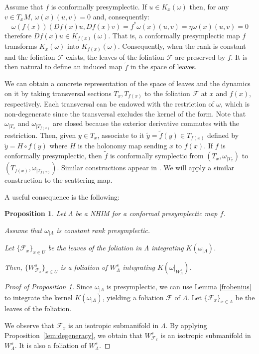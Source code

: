 \documentclass[11pt]{amsart}
\newtheorem{prop}[thm]{Proposition}
\theoremstyle{definition}
\theoremstyle{remark}
\numberwithin{equation}{section}
\newcommand{\F}{\mathcal{F}}
\begin{document}
Assume that $f$ is conformally presymplectic.
If $u \in K_x(\omega)$ then, for any $v\in T_{x}M$,  $\omega(x)(u,v)=0$ and, consequently:
\[
\omega(f(x)) (Df(x)u, Df(x)v)=f^*\omega(x)(u,v) =\eta \omega(x)(u,v)=0
\]
therefore $Df(x)u \in K_{f(x)}(\omega)$.
That is, a conformally presymplectic map $f$ transforms
$K_x(\omega)$ into $K_{f(x)}(\omega)$.
Consequently, when  the rank is constant and the foliation
$\F$ exists,  the leaves of the foliation $\F$ are
preserved by $f$. It is then natural
to define an induced map $\tilde{f}$ in the space of leaves.


We can obtain a concrete representation  of the space of leaves and the dynamics on it by taking transversal sections
$T_x, T_{f(x)} $
to the foliation $\F$ at $x$ and $f(x)$, respectively.
Each transversal  can be endowed with the restriction of
$\omega$, which is non-degenerate since the transversal
excludes the kernel of the form.
Note that $\omega_{\mid T_x}$ and $ \omega_{\mid T_{f(x)}}$
are closed because the exterior derivative commutes with the restriction.
Then, given  $y \in T_x$,
associate to it $\tilde y =\tilde f(y)\in T_{f(x)}$
defined by $\tilde y = H \circ f(y)$
where $H$ is the holonomy map  sending $x$ to $f(x)$.
If $f$ is conformally presymplectic, then
$\tilde f$ is conformally symplectic from
$(T_x,\omega_{\mid T_x})$ to $(T_{f(x)},\omega_{\mid T_{f(x)}})$.
Similar constructions appear in \cite[p. 106 ff.]{LibermannM87}.
We will apply a similar construction to the
scattering map.


A useful  consequence is the following:
\begin{prop}\label{prop:presymplectic foliation of Lambda}
  Let $\Lambda$ be a NHIM for a conformal
  presymplectic map $f$.

  Assume that $\omega_{\mid\Lambda} $ is constant
  rank presymplectic.

Let $\{\F_x  \}_{x \in U}$ be the leaves of the foliation in $\Lambda$
  integrating $K(\omega_{\mid\Lambda})$.

Then, $\{ W^s_{\F_x } \}_{x \in U}$ is a foliation of $W^s_\Lambda$ integrating $K( \omega|_{W^s_\Lambda})$.
\end{prop}


\begin{proof}[Proof of Proposition \ref{prop:presymplectic foliation of Lambda}]
 Since $\omega_{\mid\Lambda}$ is presymplectic, we can use  Lemma \ref{frobenius} to integrate the kernel $K(\omega_{\mid\Lambda})$,  yielding a foliation $\F$ of $\Lambda$.
 Let $\{\F_x  \}_{x \in \Lambda}$ be the leaves of the foliation.

  We observe that $\F_x$ is an isotropic submanifold in $\Lambda$.
  By applying Proposition~\ref{lem:degeneracy},
  we obtain that  $W^s_{\F_x}$ is an isotropic submanifold in
  $W^s_\Lambda$. It is also a foliation of $W^s_\Lambda$.
\end{proof}
\end{document}
